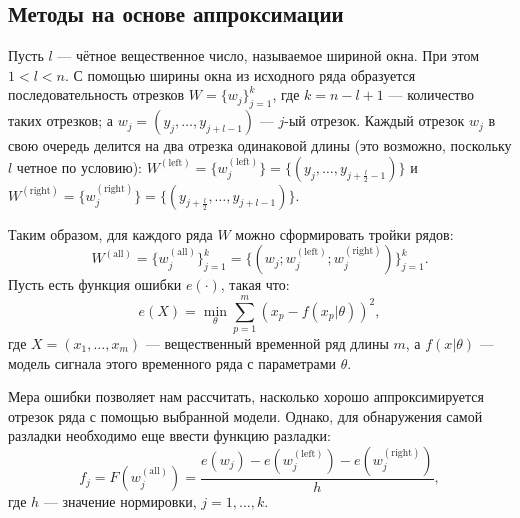 \documentclass[%
12pt,
master,  %
natbib,      %
subf,        %
substylefile = spbu.rtx,
href,        %
colorlinks,  %
]{disser}
\begin{document}
\subsection{Методы на основе аппроксимации}

Пусть $l$ --- чётное вещественное число, называемое шириной окна. При этом  $ 1 < l < n $. С помощью ширины окна из исходного ряда образуется последовательность отрезков $W = \{ w_j \}_{j=1}^k$, где $k = n - l + 1$ --- количество таких отрезков; а $ w_j = (y_j, \dots, y_{j+l-1}) $ --- $j$-ый отрезок. Каждый отрезок  $w_j$  в свою очередь делится на два отрезка одинаковой длины (это возможно, поскольку $l$ четное по условию): $ W^{\mathrm{(left)}} = \{w_j^{\mathrm{(left)}} \}  =  \{(y_j, \dots, y_{j+\frac{l}{2}-1}) \}$ и $W^{\mathrm{(right)}} = \{w_j^{\mathrm{(right)}} \} = \{(y_{j+\frac{l}{2}}, \dots, y_{j+l-1}) \}$.

Таким образом, для каждого ряда $W$ можно сформировать тройки рядов: 
\begin{equation*}
W^{\mathrm{(all)}} = \{w_j^{\mathrm{(all)}} \}_{j=1}^k =  \{(w_j; w_j^{\mathrm{(left)}}; w_j^{\mathrm{(right)}}) \}_{j=1}^k. 
\end{equation*}
Пусть есть функция ошибки $e(\cdot)$, такая что:
\begin{equation*}
e(X) = \min_{\theta}{\sum_{p=1}^m(x_p - f(x_p | \theta))^2 },
\end{equation*}
где $X = (x_1, \dots, x_m)$ ---  вещественный временной ряд длины $m$, а $f(x | \theta)$ --- модель сигнала этого временного ряда с параметрами $\theta$.


Мера ошибки позволяет нам рассчитать, насколько хорошо аппроксимируется отрезок ряда с помощью выбранной модели. Однако, для обнаружения самой разладки необходимо еще ввести функцию разладки:
\begin{equation*}
f_j = F(w_j^{\mathrm{(all)}} ) = \frac{e(w_j) - e(w_j^{\mathrm{(left)}}) - e(w_j^{\mathrm{(right)}})}{h}, 
\end{equation*}
где $h$ --- значение нормировки, $j = 1, \dots, k$.
\end{document}
